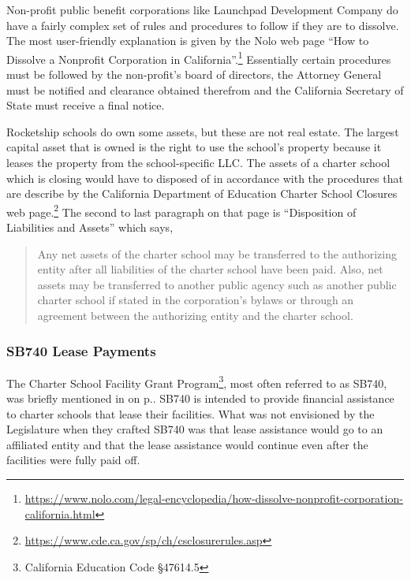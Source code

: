 Non-profit public benefit corporations like Launchpad Development Company do have a fairly complex set of rules and procedures to follow if they are to dissolve. The most user-friendly explanation is given by the Nolo web page ``How to Dissolve a Nonprofit Corporation in California''.\footnote{\url{https://www.nolo.com/legal-encyclopedia/how-dissolve-nonprofit-corporation-california.html}} Essentially certain procedures must be followed by the non-profit's board of directors, the Attorney General must be notified and clearance obtained therefrom and the California Secretary of State must receive a final notice.

Rocketship schools do own some assets, but these are not real estate. The largest capital asset that is owned is the right to use the school's property because it leases the property from the school-specific LLC. The assets of a charter school which is closing would have to disposed of in accordance with the procedures that are describe by the California Department of Education Charter School Closures web page.\footnote{\url{https://www.cde.ca.gov/sp/ch/csclosurerules.asp}} The second to last paragraph on that page is ``Disposition of Liabilities and Assets'' which says,

\blockquote[][]{\SingleSpacing
  Any net assets of the charter school may be transferred to the authorizing entity after all liabilities of the charter school have been paid. Also, net assets may be transferred to another public agency such as another public charter school if stated in the corporation's bylaws or through an agreement between the authorizing entity and the charter school.}

\subsubsection{SB740 Lease Payments}%
\label{sec:sb740-lease-payments}\indent

The Charter School Facility Grant Program\footnote{California Education Code §47614.5}, most often referred to as SB740, was briefly mentioned in  on p.\pageref{sec:rent-subsidies}. SB740 is intended to provide financial assistance to charter schools that lease their facilities. What was not envisioned by the Legislature when they crafted SB740 was that lease assistance would go to an affiliated entity and that the lease assistance would continue even after the facilities were fully paid off.

